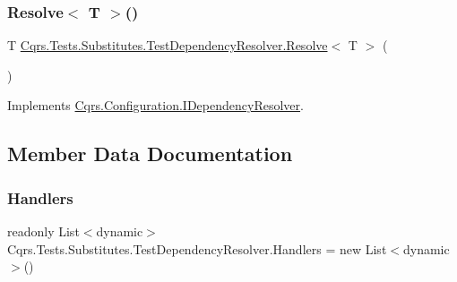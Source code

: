 \mbox{\label{classCqrs_1_1Tests_1_1Substitutes_1_1TestDependencyResolver_a67090a882241fa6a881d49c91c95cad7_a67090a882241fa6a881d49c91c95cad7}} 
\subsubsection{\texorpdfstring{Resolve$<$ T $>$()}{Resolve< T >()}}
{\footnotesize\ttfamily T \hyperlink{classCqrs_1_1Tests_1_1Substitutes_1_1TestDependencyResolver_a05767824475ea6affbf6f70cf5b1fd06_a05767824475ea6affbf6f70cf5b1fd06}{Cqrs.\+Tests.\+Substitutes.\+Test\+Dependency\+Resolver.\+Resolve}$<$ T $>$ (\begin{DoxyParamCaption}{ }\end{DoxyParamCaption})}



Implements \hyperlink{interfaceCqrs_1_1Configuration_1_1IDependencyResolver_a9dc7694a365209a5ef05270a7cfa7b6b_a9dc7694a365209a5ef05270a7cfa7b6b}{Cqrs.\+Configuration.\+I\+Dependency\+Resolver}.



\subsection{Member Data Documentation}
\mbox{\label{classCqrs_1_1Tests_1_1Substitutes_1_1TestDependencyResolver_a6fd9194240dd3d95fec9ba3788ac67e4_a6fd9194240dd3d95fec9ba3788ac67e4}} 
\subsubsection{\texorpdfstring{Handlers}{Handlers}}
{\footnotesize\ttfamily readonly List$<$dynamic$>$ Cqrs.\+Tests.\+Substitutes.\+Test\+Dependency\+Resolver.\+Handlers = new List$<$dynamic$>$()}



